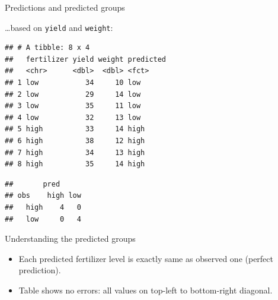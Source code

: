 \documentclass[
  ignorenonframetext,
]{beamer}
\newenvironment{Shaded}{\begin{snugshade}}{\end{snugshade}}
\newcommand{\DataTypeTok}[1]{\textcolor[rgb]{0.13,0.29,0.53}{#1}}
\newcommand{\KeywordTok}[1]{\textcolor[rgb]{0.13,0.29,0.53}{\textbf{#1}}}
\newcommand{\NormalTok}[1]{#1}
\newcommand{\OperatorTok}[1]{\textcolor[rgb]{0.81,0.36,0.00}{\textbf{#1}}}
\begin{document}
\begin{frame}[fragile]{Predictions and predicted groups}
\protect\hypertarget{predictions-and-predicted-groups}{}

\ldots based on \texttt{yield} and \texttt{weight}:

\footnotesize

\begin{Shaded}
\end{Shaded}

\begin{verbatim}
## # A tibble: 8 x 4
##   fertilizer yield weight predicted
##   <chr>      <dbl>  <dbl> <fct>    
## 1 low           34     10 low      
## 2 low           29     14 low      
## 3 low           35     11 low      
## 4 low           32     13 low      
## 5 high          33     14 high     
## 6 high          38     12 high     
## 7 high          34     13 high     
## 8 high          35     14 high
\end{verbatim}

\begin{Shaded}
\end{Shaded}

\begin{verbatim}
##       pred
## obs    high low
##   high    4   0
##   low     0   4
\end{verbatim}

\normalsize

\end{frame}

\begin{frame}{Understanding the predicted groups}
\protect\hypertarget{understanding-the-predicted-groups}{}

\begin{itemize}
\item
  Each predicted fertilizer level is exactly same as observed one
  (perfect prediction).
\item
  Table shows no errors: all values on top-left to bottom-right
  diagonal.
\end{itemize}

\end{frame}
\end{document}
